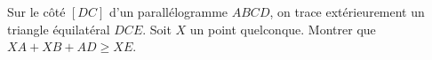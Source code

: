 Sur le côté $[DC]$ d'un parallélogramme $ABCD$, on trace extérieurement un triangle équilatéral $DCE$. Soit $X$ un point quelconque. Montrer que $XA + XB + AD \geq XE$.
